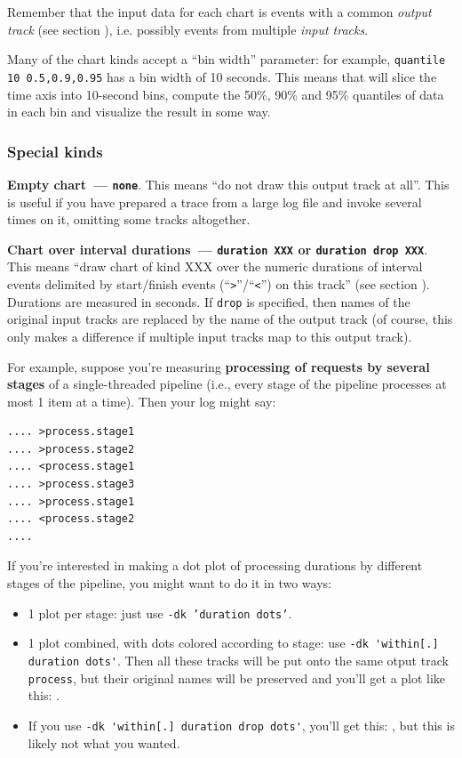\documentclass{article}
\begin{document}
Remember that the input data for each chart is events with a common \emph{output track} (see section ), i.e. possibly events from multiple \emph{input tracks}.

Many of the chart kinds accept a ``bin width'' parameter: for example, \texttt{quantile 10 0.5,0.9,0.95} has a bin width of 10 seconds. This means that \timeplot{} will slice the time axis into 10-second bins, compute the 50\%, 90\% and 95\% quantiles of data in each bin and visualize the result in some way.

\subsubsection{Special kinds}
\noindent
\textbf{Empty chart~--- \texttt{none}}. This means ``do not draw this output track at all''. This is useful if you have prepared a trace from a large log file and invoke \timeplot{} several times on it, omitting some tracks altogether.

\noindent
\textbf{Chart over interval durations~--- \texttt{duration XXX} or \texttt{duration drop XXX}}. This means ``draw chart of kind XXX over the numeric durations of interval events delimited by start/finish events (``\verb|>|''/``\verb|<|'') on this track'' (see section ). Durations are measured in seconds. If \verb|drop| is specified, then names of the original input tracks are replaced by the name of the output track (of course, this only makes a difference if multiple input tracks map to this output track).

For example, suppose you're measuring \textbf{processing of requests by several stages} of a single-threaded pipeline (i.e., every stage of the pipeline processes at most 1 item at a time). Then your log might say:
\begin{verbatim}
.... >process.stage1
.... >process.stage2
.... <process.stage1
.... >process.stage3
.... >process.stage1
.... <process.stage2
....
\end{verbatim}

If you're interested in making a dot plot of processing durations by different stages of the pipeline, you might want to do it in two ways:
\begin{itemize}
 \item 1 plot per stage: just use \texttt{-dk 'duration dots'}.
 \item 1 plot combined, with dots colored according to stage: use \verb|-dk 'within[.] duration dots'|. Then all these tracks will be put onto the same otput track \verb|process|, but their original names will be preserved and you'll get a plot like this: .
 \item If you use \verb|-dk 'within[.] duration drop dots'|, you'll get this: , but this is likely not what you wanted.
\end{itemize}
\end{document}
